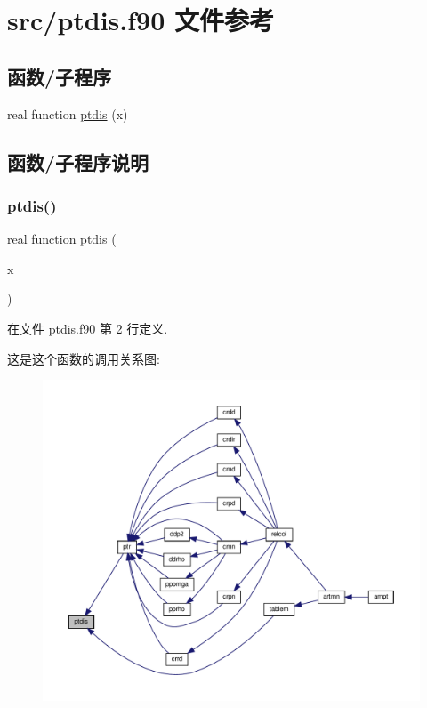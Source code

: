 \hypertarget{ptdis_8f90}{}\section{src/ptdis.f90 文件参考}
\label{ptdis_8f90}
\subsection*{函数/子程序}
\begin{DoxyCompactItemize}
\item 
real function \mbox{\hyperlink{ptdis_8f90_ae737521feed650440c8203a5c6f36fba}{ptdis}} (x)
\end{DoxyCompactItemize}


\subsection{函数/子程序说明}
\mbox{\label{ptdis_8f90_ae737521feed650440c8203a5c6f36fba}} 
\subsubsection{\texorpdfstring{ptdis()}{ptdis()}}
{\footnotesize\ttfamily real function ptdis (\begin{DoxyParamCaption}\item[{}]{x }\end{DoxyParamCaption})}



在文件 ptdis.\+f90 第 2 行定义.

这是这个函数的调用关系图\+:
\nopagebreak
\begin{figure}[H]
\begin{center}
\leavevmode
\includegraphics[width=350pt]{ptdis_8f90_ae737521feed650440c8203a5c6f36fba_icgraph}
\end{center}
\end{figure}
